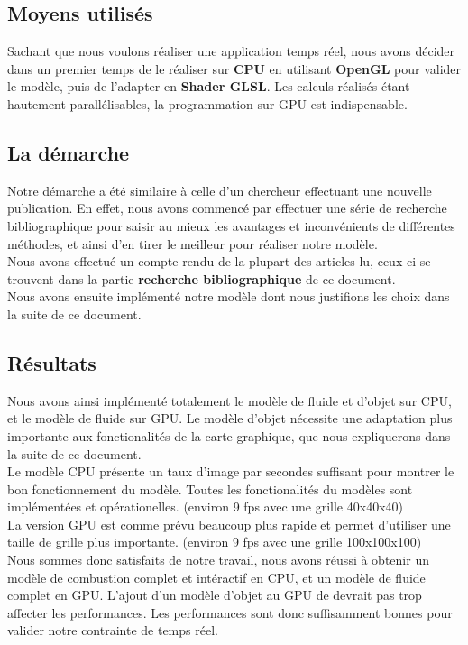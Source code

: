 \documentclass[a4paper,10pt]{article}
\begin{document}
\subsection{Moyens utilisés}
Sachant que nous voulons réaliser une application temps réel, nous avons décider dans 
un premier temps de le réaliser sur \textbf{CPU} en utilisant \textbf{OpenGL} pour valider le modèle, 
puis de l'adapter en \textbf{Shader GLSL}. Les calculs réalisés étant hautement 
parallélisables, la programmation sur GPU est indispensable.

\subsection{La démarche}
Notre démarche a été similaire à celle d'un chercheur effectuant une nouvelle
publication. En effet, nous avons commencé par effectuer une série de recherche
bibliographique pour saisir au mieux les avantages et inconvénients de différentes
méthodes, et ainsi d'en tirer le meilleur pour réaliser notre modèle.\\
Nous avons effectué un compte rendu de la plupart des articles lu, ceux-ci
se trouvent dans la partie \textbf{recherche bibliographique} de ce document.\\
Nous avons ensuite implémenté notre modèle dont nous justifions les choix
dans la suite de ce document.


\subsection{Résultats}
Nous avons ainsi implémenté totalement le modèle de fluide et d'objet sur CPU, 
et le modèle de fluide sur GPU. Le modèle d'objet nécessite une adaptation plus
importante aux fonctionalités de la carte graphique, que nous expliquerons 
dans la suite de ce document.\\
Le modèle CPU présente un taux d'image par secondes suffisant pour montrer 
le bon fonctionnement du modèle. Toutes les fonctionalités du modèles sont
implémentées et opérationelles. (environ 9 fps avec une grille 40x40x40)\\
La version GPU est comme prévu beaucoup plus rapide et permet d'utiliser
une taille de grille plus importante. (environ 9 fps avec une grille 100x100x100)\\
Nous sommes donc satisfaits de notre travail, nous avons réussi à obtenir un modèle de combustion complet et intéractif en CPU,
et un modèle de fluide complet en GPU. L'ajout d'un modèle 
d'objet au GPU de devrait pas trop affecter les performances. Les performances sont 
donc suffisamment bonnes pour valider notre contrainte de temps réel.\\
\end{document}

